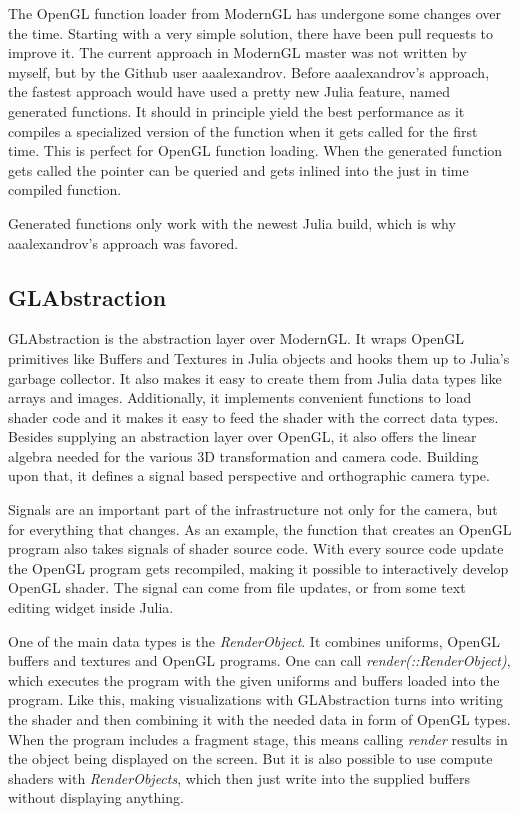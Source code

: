 The OpenGL function loader from ModernGL has undergone some changes over the time.
Starting with a very simple solution, there have been pull requests to improve it.
The current approach in ModernGL master was not written by myself, but by the Github user aaalexandrov\cite{Aaalexandrov}.
Before aaalexandrov’s approach, the fastest approach would have used a pretty new Julia feature, named generated functions.
It should in principle yield the best performance as it compiles a specialized version of the function when it gets called for the first time. This is perfect for \ac{OpenGL} function loading. When the generated function gets called the pointer can be queried and gets inlined into the just in time compiled function.

Generated functions only work with the newest Julia build, which is why aaalexandrov’s approach was favored.


\subsection{GLAbstraction}
GLAbstraction is the abstraction layer over ModernGL.
It wraps \ac{OpenGL} primitives like Buffers and Textures in Julia objects and hooks them up to Julia's garbage collector. 
It also makes it easy to create them from Julia data types like arrays and images.
Additionally, it implements convenient functions to load shader code and it makes it easy to feed the shader with the correct data types.
Besides supplying an abstraction layer over \ac{OpenGL}, it also offers the linear algebra needed for the various 3D transformation and camera code.
Building upon that, it defines a signal based perspective and orthographic camera type.

Signals are an important part of the infrastructure not only for the camera, but for everything that changes.
As an example, the function that creates an \ac{OpenGL} program also takes signals of shader source code. 
With every source code update the \ac{OpenGL} program gets recompiled, making it possible to interactively develop OpenGL shader. The signal can come from file updates, or from some text editing widget inside Julia.

One of the main data types is the \textit{RenderObject}.
It combines uniforms, OpenGL buffers and textures and OpenGL programs. 
One can call \textit{render(::RenderObject)}, which executes the program with the given uniforms and buffers loaded into the program. 
Like this, making visualizations with GLAbstraction turns into writing the shader and then combining it with the needed data in form of OpenGL types.
When the program includes a fragment stage, this means calling \textit{render} results in the object being displayed on the screen. But it is also possible to use compute shaders with \textit{RenderObjects}, which then just write into the supplied buffers without displaying anything.

